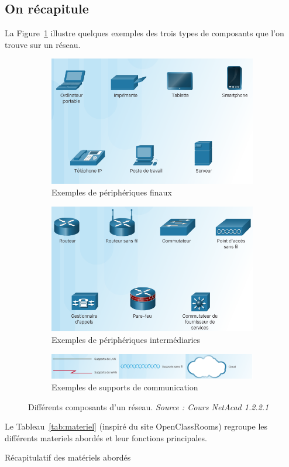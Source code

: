 
\subsection{On récapitule}
La Figure~\ref{fig:composants} illustre quelques exemples des trois types de composants que l'on trouve sur un réseau.

\begin{figure}[h!t]
\centering
  \begin{subfigure}{.49\textwidth}
    \includegraphics[width=\linewidth]{images/materiel/terminaux}
    \caption{Exemples de périphériques finaux}
  \end{subfigure}
  \begin{subfigure}{.49\textwidth}
    \includegraphics[width=\linewidth]{images/materiel/intermediaires}
    \caption{Exemples de périphériques intermédiaries}
  \end{subfigure}

  \begin{subfigure}{.98\textwidth}
    \includegraphics[width=\linewidth]{images/materiel/supports}
    \caption{Exemples de supports de communication}
  \end{subfigure}
  \caption{Différents composants d'un réseau. \textit{Source : Cours NetAcad 1.2.2.1}}
  \label{fig:composants}
\end{figure}

Le Tableau~\ref{tab:materiel} (inspiré du site OpenClassRooms) regroupe les différents materiels abordés et leur fonctions principales.

\begin{table}[h!t]
\centering
  
  \caption{Récapitulatif des matériels abordés}
  \label{tab:materiel}
\end{table}
